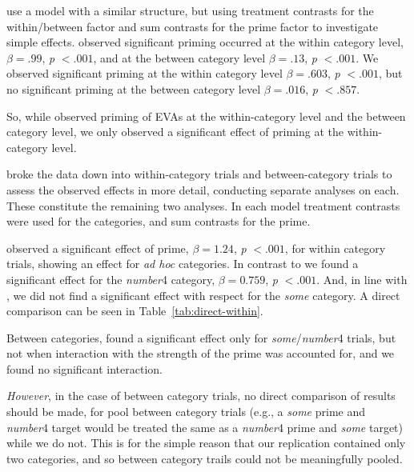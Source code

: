 \documentclass[10pt]{article}
\begin{document}
\begin{multicols}{2}
\citeauthor{Bott:2016aa} use a model with a similar structure, but using treatment contrasts for the within/between factor and sum contrasts for the prime factor to investigate simple effects.
\citeauthor{Bott:2016aa} observed significant priming occurred at the within category level, \(\beta = .99\), \emph{p} \(< .001\), and at the between category level \(\beta = .13\), \emph{p} \(< .001\).
We observed significant priming at the within category level \(\beta = .603\), \emph{p} \(<.001\), but no significant priming at the between category level \(\beta = .016\), \emph{p} \(< .857\).

So, while \citeauthor{Bott:2016aa} observed priming of EVAs at the within-category level and the between category level, we only observed a significant effect of priming at the within-category level.

\citeauthor{Bott:2016aa} broke the data down into within-category trials and between-category trials to assess the observed effects in more detail, conducting separate analyses on each.
These constitute the remaining two analyses.
In each model treatment contrasts were used for the categories, and sum contrasts for the prime.

\citeauthor{Bott:2016aa} observed a significant effect of prime, \(\beta = 1.24\), \emph{p} \(< .001\), for within category trials, showing an effect for \emph{ad hoc} categories.
In contrast to \citeauthor{Bott:2016aa} we found a significant effect for the \emph{number}4 category, \(\beta = 0.759\), \emph{p} \(< .001\).
And, in line with \citeauthor{Bott:2016aa}, we did not find a significant effect with respect for the \emph{some} category.
A direct comparison can be seen in Table~\ref{tab:direct-within}.

Between categories, \citeauthor{Bott:2016aa} found a significant effect only for \emph{some}/\emph{number}4 trials, but not when interaction with the strength of the prime was accounted for, and we found no significant interaction.

\emph{However}, in the case of between category trials, no direct comparison of results should be made, for \citeauthor{Bott:2016aa} pool between category trials (e.g., a \emph{some} prime and \emph{number}4 target would be treated the same as a \emph{number}4 prime and \emph{some} target) while we do not.
This is for the simple reason that our replication contained only two categories, and so between category trails could not be meaningfully pooled.


\end{multicols}
\end{document}
